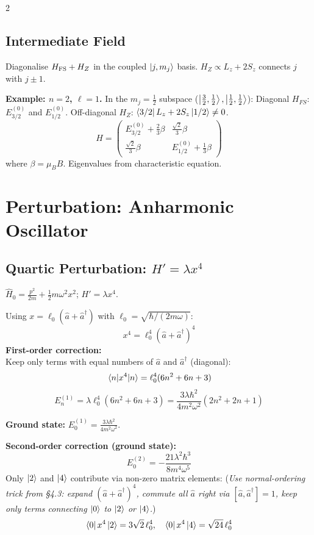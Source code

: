 \documentclass[9pt,a4paper]{article} %
\newcommand{\Hhat}{\hat{H}}
\newcommand{\aop}{\hat{a}}
\newcommand{\adop}{\hat{a}^\dagger}
\begin{document}
\begin{multicols}{2}
\subsection{Intermediate Field}
Diagonalise $H_{\rm FS} + H_Z$ in the coupled $\ket{j,m_j}$ basis. $H_{Z} \propto L_z+2S_z$ connects $j$ with $j\pm 1$.

{\footnotesize
\textbf{Example: $n=2$, $\ell=1$.}
In the $m_j = \frac{1}{2}$ subspace ($\ket{\frac{3}{2},\frac{1}{2}}, \ket{\frac{1}{2},\frac{1}{2}}$):
Diagonal $H_{FS}$: $E_{3/2}^{(0)}$ and $E_{1/2}^{(0)}$.
Off-diagonal $H_Z$: $\bra{3/2}L_z+2S_z\ket{1/2} \ne 0$.
\[
H = \begin{pmatrix} E_{3/2}^{(0)} + \frac{2}{3}\beta & \frac{\sqrt{2}}{3}\beta \\[4pt] \frac{\sqrt{2}}{3}\beta & E_{1/2}^{(0)} + \frac{1}{3}\beta \end{pmatrix}
\]
where $\beta = \mu_B B$. Eigenvalues from characteristic equation.
}

\section{Perturbation: Anharmonic Oscillator}

\subsection{Quartic Perturbation: $H' = \lambda x^4$}
$\Hhat_0 = \frac{p^2}{2m} + \frac{1}{2}m\omega^2 x^2$;\; $H' = \lambda x^4$.

Using $x = \ell_0(\aop + \adop)$ with $\ell_0 = \sqrt{\hbar/(2m\omega)}$:
\[
x^4 = \ell_0^4 (\aop + \adop)^4
\]
\textbf{First-order correction:}\\
Keep only terms with equal numbers of $\aop$ and $\adop$ (diagonal):
\[
\ev{x^4}{n} = \ell_0^4(6n^2 + 6n + 3)
\]
\[
\boxed{E_n^{(1)} = \lambda\ell_0^4(6n^2 + 6n + 3) = \frac{3\lambda\hbar^2}{4m^2\omega^2}(2n^2 + 2n + 1)}
\]

\textbf{Ground state:}
$E_0^{(1)} = \frac{3\lambda\hbar^2}{4m^2\omega^2}$.

\textbf{Second-order correction (ground state):}
\[
E_0^{(2)} = -\frac{21\lambda^2\hbar^3}{8m^4\omega^5}
\]
Only $\ket{2}$ and $\ket{4}$ contribute via non-zero matrix elements:
{\footnotesize(\textit{Use normal-ordering trick from \S4.3: expand $(\aop+\adop)^4$, commute all $\aop$ right via $[\aop,\adop]=1$, keep only terms connecting $\ket{0}$ to $\ket{2}$ or $\ket{4}$.})}
\[
\bra{0}x^4\ket{2} = 3\sqrt{2}\,\ell_0^4,\quad \bra{0}x^4\ket{4} = \sqrt{24}\,\ell_0^4
\]


\end{multicols}
\end{document}
